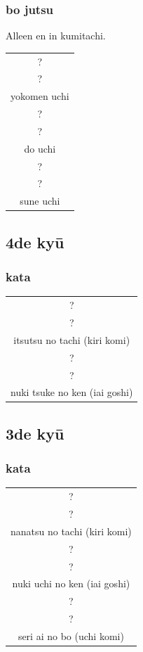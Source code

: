\documentclass[12pt]{scrartcl}
\begin{document}
\begin{CJK*}{UTF8}{min}
\subsubsection{bo jutsu}
\noindent Alleen en in kumitachi.
\begin{table}[H]
\begin{center}
\begin{tabular}{c}
?\\
?\\
yokomen uchi\\
\hline
?\\
?\\
do uchi\\
\hline
?\\
?\\
sune uchi
\end{tabular}
\end{center}
\label{kyuu_5_katori_bo}
\end{table}

\subsection{4de ky\={u}}
\subsubsection{kata}
\begin{table}[H]
\begin{center}
\begin{tabular}{c}
?\\
?\\
itsutsu no tachi (kiri komi)\\
\hline
?\\
?\\
nuki tsuke no ken (iai goshi)
\end{tabular}
\end{center}
\label{kyuu_4_katori_kata}
\end{table}

\subsection{3de ky\={u}}
\subsubsection{kata}
\begin{table}[H]
\begin{center}
\begin{tabular}{c}
?\\
?\\
nanatsu no tachi (kiri komi)\\
\hline
?\\
?\\
nuki uchi no ken (iai goshi)\\
\hline
?\\
?\\
seri ai no bo (uchi komi)
\end{tabular}
\end{center}
\label{kyuu_3_katori_kata}
\end{table}


\end{CJK*}
\end{document}
